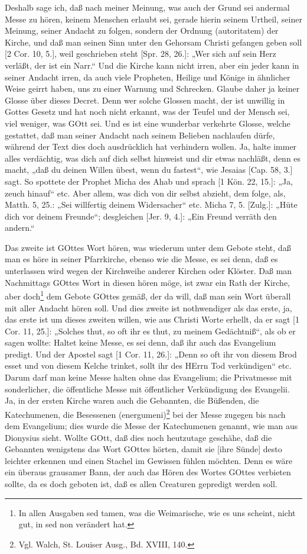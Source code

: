 Deshalb sage ich, daß nach meiner Meinung, was auch der Grund sei andermal Messe zu hören, keinem Menschen erlaubt sei, gerade hierin seinem Urtheil, seiner Meinung, seiner Andacht zu folgen, sondern der Ordnung (autoritatem) der Kirche, und daß man seinen Sinn unter den Gehorsam Christi gefangen geben soll [2 Cor. 10, 5.], weil geschrieben steht [Spr. 28, 26.]: „Wer sich auf sein Herz verläßt, der ist ein Narr.“ Und die Kirche kann nicht irren, aber ein jeder kann in seiner Andacht irren, da auch viele Propheten, Heilige und Könige in ähnlicher Weise geirrt haben, uns zu einer Warnung und Schrecken. Glaube daher ja keiner Glosse über dieses Decret. Denn wer solche Glossen macht, der ist unwillig in Gottes Gesetz und hat noch nicht erkannt, was der Teufel und der Mensch sei, viel weniger, was GOtt sei. Und es ist eine wunderbar verkehrte Glosse, welche gestattet, daß man seiner Andacht nach seinem Belieben nachlaufen dürfe, während der Text dies doch ausdrücklich hat verhindern wollen. Ja, halte immer alles verdächtig, was dich auf dich selbst hinweist und dir etwas nachläßt, denn es macht, „daß du deinen Willen übest, wenn du fastest“, wie Jesaias [Cap. 58, 3.] sagt. So spottete der Prophet Micha des Ahab und sprach [1 Kön. 22, 15.]: „Ja, zeuch hinauf“ etc. Aber allem, was dich von dir selbst abzieht, dem folge, als, Matth. 5, 25.: „Sei willfertig deinem Widersacher“ etc. Micha 7, 5. [Zulg.]: „Hüte dich vor deinem Freunde“; desgleichen [Jer. 9, 4.]: „Ein Freund verräth den andern.“

Das zweite ist GOttes Wort hören, was wiederum unter dem Gebote steht, daß man es höre in seiner Pfarrkirche, ebenso wie die Messe, es sei denn, daß es unterlassen wird wegen der Kirchweihe anderer Kirchen oder Klöster. Daß man Nachmittags GOttes Wort in diesen hören möge, ist zwar ein Rath der Kirche, aber doch\footnote{In allen Ausgaben sed tamen, was die Weimarische, wie es uns scheint, nicht gut, in sed non verändert hat.} dem Gebote GOttes gemäß, der da will, daß man sein Wort überall mit aller Andacht hören soll. Und dies zweite ist nothwendiger als das erste, ja, das erste ist um dieses zweiten willen, wie aus Christi Worte erhellt, da er sagt [1 Cor. 11, 25.]: „Solches thut, so oft ihr es thut, zu meinem Gedächtniß“, als ob er sagen wollte: Haltet keine Messe, es sei denn, daß ihr auch das Evangelium predigt. Und der Apostel sagt [1 Cor. 11, 26.]: „Denn so oft ihr von diesem Brod esset und von diesem Kelche trinket, sollt ihr des HErrn Tod verkündigen“ etc. Darum darf man keine Messe halten ohne das Evangelium; die Privatmesse mit sonderlicher, die öffentliche Messe mit öffentlicher Verkündigung des Evangelii. Ja, in der ersten Kirche waren auch die Gebannten, die Büßenden, die Katechumenen, die Besessenen (energumeni)\footnote{Vgl. Walch, St. Louiser Ausg., Bd. XVIII, 140.} bei der Messe zugegen bis nach dem Evangelium; dies wurde die Messe der Katechumenen genannt, wie man aus Dionysius sieht. Wollte GOtt, daß dies noch heutzutage geschähe, daß die Gebannten wenigstens das Wort GOttes hörten, damit sie [ihre Sünde] desto leichter erkennen und einen Stachel im Gewissen fühlen möchten. Denn es wäre ein überaus grausamer Bann, der auch das Hören des Wortes GOttes verbieten sollte, da es doch geboten ist, daß es allen Creaturen gepredigt werden soll.

